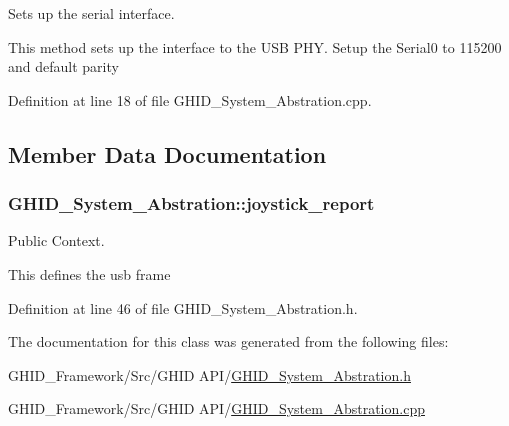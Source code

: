 \-Sets up the serial interface. 

\-This method sets up the interface to the \-U\-S\-B \-P\-H\-Y. \-Setup the \-Serial0 to 115200 and default parity 

\-Definition at line 18 of file \-G\-H\-I\-D\-\_\-\-System\-\_\-\-Abstration.\-cpp.



\subsection{\-Member \-Data \-Documentation}
\hypertarget{class_g_h_i_d___system___abstration_a7b6a61d7f6516c004300bccae5145ca4}{
\subsubsection[{joystick\-\_\-report}]{ {\bf \-G\-H\-I\-D\-\_\-\-System\-\_\-\-Abstration\-::joystick\-\_\-report}}}\label{class_g_h_i_d___system___abstration_a7b6a61d7f6516c004300bccae5145ca4}


\-Public \-Context. 

\-This defines the usb frame 

\-Definition at line 46 of file \-G\-H\-I\-D\-\_\-\-System\-\_\-\-Abstration.\-h.



\-The documentation for this class was generated from the following files\-:\begin{DoxyCompactItemize}
\item 
\-G\-H\-I\-D\-\_\-\-Framework/\-Src/\-G\-H\-I\-D A\-P\-I/\hyperlink{_g_h_i_d___system___abstration_8h}{\-G\-H\-I\-D\-\_\-\-System\-\_\-\-Abstration.\-h}\item 
\-G\-H\-I\-D\-\_\-\-Framework/\-Src/\-G\-H\-I\-D A\-P\-I/\hyperlink{_g_h_i_d___system___abstration_8cpp}{\-G\-H\-I\-D\-\_\-\-System\-\_\-\-Abstration.\-cpp}\end{DoxyCompactItemize}
